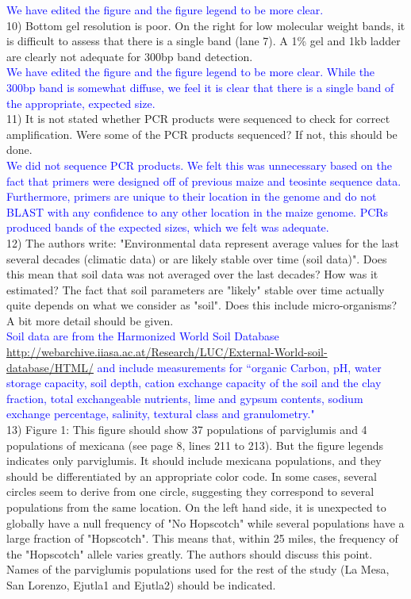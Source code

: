 \documentclass[11pt]{article}
\newcommand{\res}[1]{\noindent \textcolor{blue}{{#1}} \\}
\begin{document}
\res{We have edited the figure and the figure legend to be more clear.}

10) Bottom gel resolution is poor. On the right for low molecular weight bands, it is difficult to assess that there is a single band (lane 7). A 1\% gel and 1kb ladder are clearly not adequate for 300bp band detection.\\

\res{We have edited the figure and the figure legend to be more clear.  While the 300bp band is somewhat diffuse, we feel it is clear that there is a single band of the appropriate, expected size.}

11) It is not stated whether PCR products were sequenced to check for correct amplification. Were some of the PCR products sequenced? If not, this should be done.\\

\res{We did not sequence PCR products. We felt this was unnecessary based on the fact that primers were designed off of previous maize and teosinte sequence data. Furthermore, primers are unique to their location in the genome and do not BLAST with any confidence to any other location in the maize genome. PCRs produced bands of the expected sizes, which we felt was adequate.}

12) The authors write: "Environmental data represent average values for the last several decades (climatic data) or are likely stable over time (soil data)". Does this mean that soil data was not averaged over the last decades? How was it estimated? The fact that soil parameters are "likely" stable over time actually quite depends on what we consider as "soil". Does this include micro-organisms? A bit more detail should be given.\\

\res{Soil data are from the Harmonized World Soil Database \url{http://webarchive.iiasa.ac.at/Research/LUC/External-World-soil-database/HTML/} and include measurements for ``organic Carbon, pH, water storage capacity, soil depth, cation exchange capacity of the soil and the clay fraction, total exchangeable nutrients, lime and gypsum contents, sodium exchange percentage, salinity, textural class and granulometry."}

13) Figure 1: This figure should show 37 populations of parviglumis and 4 populations of mexicana (see page 8, lines 211 to 213). But the figure legends indicates only parviglumis. It should include mexicana populations, and they should be differentiated by an appropriate color code. In some cases, several circles seem to derive from one circle, suggesting they correspond to several populations from the same location. On the left hand side, it is unexpected to globally have a null frequency of "No Hopscotch" while several populations have a large fraction of "Hopscotch". This means that, within 25 miles, the frequency of the "Hopscotch" allele varies greatly. The authors should discuss this point. Names of the parviglumis populations used for the rest of the study (La Mesa, San Lorenzo, Ejutla1 and Ejutla2) should be indicated.\\
\end{document}
